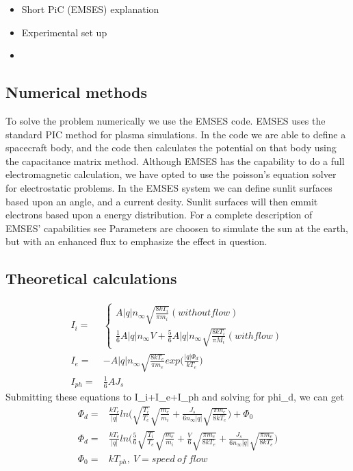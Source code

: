 \begin{itemize}
	\item Short PiC (EMSES) explanation
	\item Experimental set up
	\item 
\end{itemize}
\subsection{Numerical methods}

To solve the problem numerically we use the EMSES code. EMSES uses the standard PIC method for plasma simulations.
In the code we are able to define a spacecraft body, and the code then calculates the potential on that body using the capacitance matrix method.
Although EMSES has the capability to do a full electromagnetic calculation, we have opted to use the poisson's equation 
solver for electrostatic problems. In the EMSES system we can define sunlit surfaces based upon an angle, and a current 
desity. Sunlit surfaces will then emmit electrons based upon a energy distribution. For a complete description of EMSES' capabilities
see \citep{nakashima_ohhelp:_2009} Parameters are choosen to simulate the sun at the earth, but with an enhanced flux to emphasize the effect in question. 

\subsection{Theoretical calculations}

\begin{equation}
\begin{split}
 I_i = &
    \left\{\begin{array}{ccc}
       A|q|n_\infty\sqrt{\frac{8 k T_i}{\pi m_i}} (without flow)\\
       \frac{1}{6}A |q|n_\infty V + \frac{5}{6} A |q| n_\infty \sqrt{\frac{8 k T_i}{\pi M_i}}(with flow)
      \end{array}\right. \\
  I_e = & -A|q|n_\infty \sqrt{\frac{8 k T_e}{\pi m_e}}exp\Big(\frac{|q|\Phi_d}{k T_e}\Big)\\
  I_{ph} = & \frac{1}{6} AJ_s
\end{split}
\label{thin sheet potential} 
\end{equation}
Submitting these equations to I_i+I_e+I_ph and solving for phi_d, we can get
\begin{equation}
\begin{split}
 \Phi_d = & \frac{k T_e}{|q|}ln\Big(\sqrt{\frac{T_i}{T_e}}\sqrt{\frac{m_e}{m_i}}+\frac{J_s}{6 n_\infty |q|}\sqrt{\frac{\pi m_e}{8 k T_e}}\Big) + \Phi_0 \\
 \Phi_d = & \frac{k T_e}{|q|}ln\Big(\frac{5}{6}\sqrt{\frac{T_i}{T_e}}\sqrt{\frac{m_e}{m_i}}+\frac{V}{6}\sqrt{\frac{\pi m_e}{8 k T_e}} + \frac{J_s}{6 n_\infty |q|}\sqrt{\frac{\pi m_e}{8 k T_e}} \Big) \\
 \Phi_0 = & k T_{ph}, \ V = speed\ of\ flow
\end{split}
\label{thin sheet potential 2} 
\end{equation}


